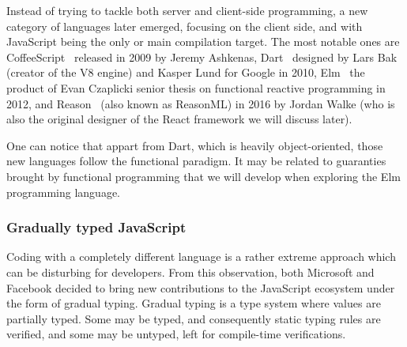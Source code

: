 Instead of trying to tackle both server and client-side programming,
a new category of languages later emerged, focusing on the client side,
and with JavaScript being the only or main compilation target.
The most notable ones are CoffeeScript~\cite{coffeescript} released in 2009
by Jeremy Ashkenas, Dart~\cite{dart-blog} designed by Lars Bak
(creator of the V8 engine) and Kasper Lund for Google in 2010,
Elm~\cite{czaplicki2013asynchronous} the product of Evan Czaplicki senior thesis
on functional reactive programming in 2012,
and Reason~\cite{reason} (also known as ReasonML) in 2016 by Jordan Walke (who is
also the original designer of the React framework we will discuss later).

One can notice that appart from Dart, which is heavily object-oriented,
those new languages follow the functional paradigm.
It may be related to guaranties brought by functional programming
that we will develop when exploring the Elm programming language.


\subsubsection{Gradually typed JavaScript}%
\label{ssub:gradually_typed_javascript}

Coding with a completely different language is a rather extreme approach
which can be disturbing for developers.
From this observation, both Microsoft and Facebook decided to bring
new contributions to the JavaScript ecosystem under the form of gradual typing.
Gradual typing is a type system where values are partially typed.
Some may be typed, and consequently static typing rules are verified,
and some may be untyped, left for compile-time verifications.

